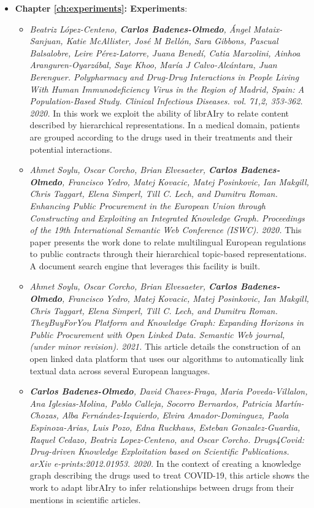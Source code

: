 \begin{itemize}
\begin{itemize}
\end{itemize}
\item \textbf{Chapter \ref{ch:experiments}: Experiments}:
\begin{itemize}
\item \textit{Beatriz López-Centeno, \textbf{Carlos Badenes-Olmedo}, Ángel Mataix-Sanjuan, Katie McAllister, José M Bellón, Sara Gibbons, Pascual Balsalobre, Leire Pérez-Latorre, Juana Benedí, Catia Marzolini, Ainhoa Aranguren-Oyarzábal, Saye Khoo, María J Calvo-Alcántara, Juan Berenguer. \textit{Polypharmacy and Drug-Drug Interactions in People Living With Human Immunodeficiency Virus in the Region of Madrid, Spain: A Population-Based Study}. Clinical Infectious Diseases. vol. 71,2, 353-362. 2020.} In this work we exploit the ability of librAIry to relate content described by hierarchical representations. In a medical domain, patients are grouped according to the drugs used in their treatments and their potential interactions.
\item \textit{Ahmet Soylu, Oscar Corcho, Brian Elvesaeter, \textbf{Carlos Badenes-Olmedo}, Francisco Yedro, Matej Kovacic, Matej Posinkovic, Ian Makgill, Chris Taggart, Elena Simperl, Till C. Lech, and Dumitru Roman. \textit{Enhancing Public Procurement in the European Union through Constructing and Exploiting an Integrated Knowledge Graph}. Proceedings of the 19th International Semantic Web Conference (ISWC). 2020.} This paper presents the work done to relate multilingual European regulations to public contracts through their hierarchical topic-based representations. A document search engine that leverages this facility is built.  
\item \textit{Ahmet Soylu, Oscar Corcho, Brian Elvesaeter, \textbf{Carlos Badenes-Olmedo}, Francisco Yedro, Matej Kovacic, Matej Posinkovic, Ian Makgill, Chris Taggart, Elena Simperl, Till C. Lech, and Dumitru Roman. \textit{TheyBuyForYou Platform and Knowledge Graph: Expanding Horizons in Public Procurement with Open Linked Data}. Semantic Web journal, (under minor revision). 2021.} This article details the construction of an open linked data platform that uses our algorithms to automatically link textual data across several European languages.  
\item \textit{\textbf{Carlos Badenes-Olmedo}, David Chaves-Fraga, Maria Poveda-Villalon, Ana Iglesias-Molina, Pablo Calleja, Socorro Bernardos, Patricia Martín-Chozas, Alba Fernández-Izquierdo, Elvira Amador-Dominguez, Paola Espinoza-Arias, Luis Pozo, Edna Ruckhaus, Esteban Gonzalez-Guardia, Raquel Cedazo, Beatriz Lopez-Centeno, and Oscar Corcho. \textit{Drugs4Covid: Drug-driven Knowledge Exploitation based on Scientific Publications}. arXiv e-prints:2012.01953. 2020.} In the context of creating a knowledge graph describing the drugs used to treat COVID-19, this article shows the work to adapt librAIry to infer relationships between drugs from their mentions in scientific articles. 
\end{itemize}
\end{itemize}



